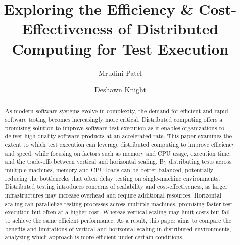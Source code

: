 \documentclass[runningheads]{llncs}
\begin{document}
%
\title{Exploring the Efficiency \& Cost-Effectiveness of Distributed Computing for Test Execution}
%
%
%
\author{Mrudini Patel \and
Deshawn Knight}
%
%
%
%
\maketitle              %
%
%
\begin{abstract}
As modern software systems evolve in complexity, the demand for efficient and rapid software testing becomes increasingly more critical. Distributed computing offers a promising solution to improve software test execution as it enables organizations to deliver high-quality software products at an accelerated rate. This paper examines the extent to which test execution can leverage distributed computing to improve efficiency and speed, while focusing on factors such as memory and CPU usage, execution time, and the trade-offs between vertical and horizontal scaling. By distributing tests across multiple machines, memory and CPU loads can be better balanced, potentially reducing the bottlenecks that often delay testing on single-machine environments. Distributed testing introduces concerns of scalability and cost-effectiveness, as larger infrastructures may increase overhead and require additional resources.  Horizontal scaling can parallelize testing processes across multiple machines, promising faster test execution but often at a higher cost. Whereas vertical scaling may limit costs but fail to achieve the same efficient performance. As a result, this paper aims to compare the benefits and limitations of vertical and horizontal scaling in distributed environments, analyzing which approach is more efficient under certain conditions. 

\end{abstract}
%
%



\pagebreak



%
%
%



% 
\end{document}
